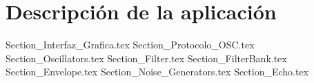 \chapter{Descripción de la aplicación}

	{Section_Interfaz_Grafica.tex}
	{Section_Protocolo_OSC.tex}
	{Section_Oscillators.tex}
	{Section_Filter.tex}	
	{Section_FilterBank.tex}	
	{Section_Envelope.tex}	
	{Section_Noise_Generators.tex}
	{Section_Echo.tex}
